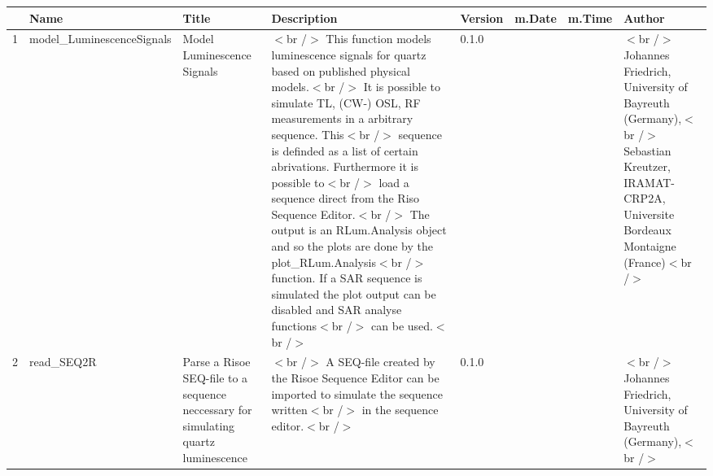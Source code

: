 \begin{table}[ht]
\centering
\begin{tabular}{rlllllll}
  \hline
 & Name & Title & Description & Version & m.Date & m.Time & Author \\ 
  \hline
1 & model\_LuminescenceSignals & Model Luminescence Signals & $<$br /$>$ This function models luminescence signals for quartz based on published physical models.$<$br /$>$ It is possible to simulate TL, (CW-) OSL, RF measurements in a arbitrary sequence. This$<$br /$>$ sequence is definded as a list of certain abrivations. Furthermore it is possible to$<$br /$>$ load a sequence direct from the Riso Sequence Editor.$<$br /$>$ The output is an RLum.Analysis object and so the plots are done by the plot\_RLum.Analysis$<$br /$>$ function. If a SAR sequence is simulated the plot output can be disabled and SAR analyse functions$<$br /$>$ can be used.$<$br /$>$ & 0.1.0
 &  &  & $<$br /$>$ Johannes Friedrich, University of Bayreuth (Germany),$<$br /$>$ Sebastian Kreutzer, IRAMAT-CRP2A, Universite Bordeaux Montaigne (France)$<$br /$>$ \\ 
  2 & read\_SEQ2R & Parse a Risoe SEQ-file to a sequence neccessary for simulating quartz luminescence & $<$br /$>$ A SEQ-file created by the Risoe Sequence Editor can be imported to simulate the sequence written$<$br /$>$ in the sequence editor.$<$br /$>$ & 0.1.0
 &  &  & $<$br /$>$ Johannes Friedrich, University of Bayreuth (Germany),$<$br /$>$ \\ 
   \hline
\end{tabular}
\end{table}

